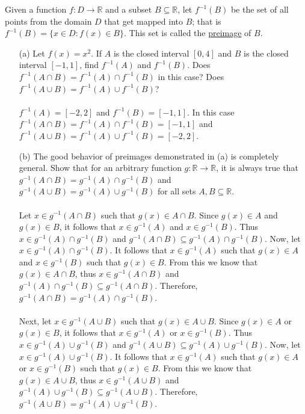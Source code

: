 \documentclass[11pt]{article}
\def\R{{\mathbb{R}}}
\newenvironment{exer}[1]
    {\renewcommand\theinnercustomexer{#1}\innercustomexer\upshape}
    {\endinnercustomexer}
\begin{document}
\begin{exer}{1.2.9}
    Given a function $f:D\to\R$ and a subset $B\subseteq\R$, let $f^{-1}(B)$ be the set of all points from the domain $D$ that get mapped into $B$; that is $f^{-1}(B)=\{x\in D:f(x)\in B\}$. This set is called the \underline{preimage} of $B$.
    \begin{enumerate}
        \item[(a)]
            Let $f(x)=x^2$. If $A$ is the closed interval $[0,4]$ and $B$ is the closed interval $[-1,1]$, find $f^{-1}(A)$ and $f^{-1}(B)$. Does $f^{-1}(A\cap B)=f^{-1}(A)\cap f^{-1}(B)$ in this case? Does $f^{-1}(A\cup B)=f^{-1}(A)\cup f^{-1}(B)$? \\ \\
            $f^{-1}(A)=[-2,2]$ and $f^{-1}(B)=[-1, 1]$. In this case $f^{-1}(A\cap B)=f^{-1}(A)\cap f^{-1}(B)=[-1,1]$ and $f^{-1}(A\cup B)=f^{-1}(A)\cup f^{-1}(B)=[-2,2]$.
        \item[(b)]
            The good behavior of preimages demonstrated in (a) is completely general. Show that for an arbitrary function $g:\R\to\R$, it is always true that $g^{-1}(A\cap B)=g^{-1}(A)\cap g^{-1}(B)$ and $g^{-1}(A\cup B)=g^{-1}(A)\cup g^{-1}(B)$ for all sets $A,B\subseteq\R$. \\ \\
            Let $x\in g^{-1}(A\cap B)$ such that $g(x)\in A\cap B$. Since $g(x)\in A$ and $g(x)\in B$, it follows that $x\in g^{-1}(A)$ and $x\in g^{-1}(B)$. Thus $x\in g^{-1}(A)\cap g^{-1}(B)$ and $g^{-1}(A\cap B)\subseteq g^{-1}(A)\cap g^{-1}(B)$. Now, let $x\in g^{-1}(A)\cap g^{-1}(B)$. It follows that $x\in g^{-1}(A)$ such that $g(x)\in A$ and $x\in g^{-1}(B)$ such that $g(x)\in B$. From this we know that $g(x)\in A\cap B$, thus $x\in g^{-1}(A\cap B)$ and $g^{-1}(A)\cap g^{-1}(B)\subseteq g^{-1}(A\cap B)$. Therefore, $g^{-1}(A\cap B)=g^{-1}(A)\cap g^{-1}(B)$. \\ \\
            Next, let $x\in g^{-1}(A\cup B)$ such that $g(x)\in A\cup B$. Since $g(x)\in A$ or $g(x)\in B$, it follows that $x\in g^{-1}(A)$ or $x\in g^{-1}(B)$. Thus $x\in g^{-1}(A)\cup g^{-1}(B)$ and $g^{-1}(A\cup B)\subseteq g^{-1}(A)\cup g^{-1}(B)$. Now, let $x\in g^{-1}(A)\cup g^{-1}(B)$. It follows that $x\in g^{-1}(A)$ such that $g(x)\in A$ or $x\in g^{-1}(B)$ such that $g(x)\in B$. From this we know that $g(x)\in A\cup B$, thus $x\in g^{-1}(A\cup B)$ and $g^{-1}(A)\cup g^{-1}(B)\subseteq g^{-1}(A\cup B)$. Therefore, $g^{-1}(A\cup B)=g^{-1}(A)\cup g^{-1}(B)$.
    \end{enumerate}
\end{exer}
\end{document}
